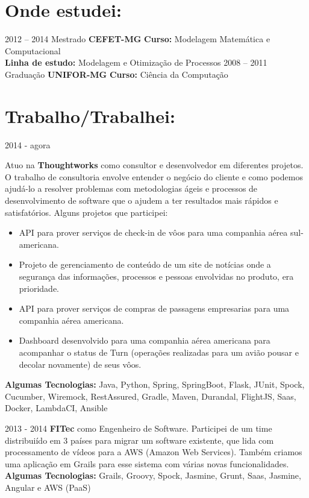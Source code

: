 \documentclass[]{friggeri-cv}
\begin{document}
\section{Onde estudei:}

\begin{entrylist}
  \entry
    {2012 – 2014}
    {Mestrado}
    {\textbf{CEFET-MG}}
    {\textbf{Curso:} Modelagem Matemática e Computacional\\ \textbf{Linha de estudo:} Modelagem e Otimização de Processos}
  \entry
    {2008 – 2011}
    {Graduação}
    {\textbf{UNIFOR-MG}}
    {\textbf{Curso:} Ciência da Computação}  
\end{entrylist}

\section{Trabalho/Trabalhei:}
\begin{entrylist}
  \entry
    {2014 - agora}
    {{\normalfont Atuo na \textbf{Thoughtworks} como consultor e desenvolvedor em diferentes projetos. O trabalho de consultoria envolve entender o negócio do cliente e como podemos ajudá-lo a resolver problemas com metodologias ágeis e processos de desenvolvimento de software que o ajudem a ter resultados mais rápidos e satisfatórios. Alguns projetos que participei:\\
    \begin{itemize}  
\item API para prover serviços de check-in de vôos para uma companhia aérea sul-americana.
\item Projeto de gerenciamento de conteúdo de um site de notícias onde a segurança das informações, processos e pessoas envolvidas no produto, era prioridade.
\item API para prover serviços de compras de passagens empresarias para uma companhia aérea americana.
\item Dashboard desenvolvido para uma companhia aérea americana para acompanhar o status de Turn (operações realizadas para um avião pousar e decolar novamente) de seus vôos.
\end{itemize}
\textbf{Algumas Tecnologias:} Java, Python, Spring, SpringBoot, Flask, JUnit, Spock, Cucumber, Wiremock, RestAssured, Gradle, Maven, Durandal, FlightJS, Saas, Docker, LambdaCI, Ansible
    }}{}{}
  
  \entry
    {2013 - 2014}
    {{\normalfont \textbf{FITec} como Engenheiro de Software.  Participei de um time distribuiído em 3 países para migrar um software existente, que lida com processamento de vídeos para a AWS (Amazon Web Services). Também criamos uma aplicação em Grails para esse sistema com várias novas funcionalidades.
        \\\textbf{Algumas Tecnologias:} Grails, Groovy, Spock, Jasmine, Grunt, Saas, Jasmine, Angular e AWS (PaaS)
    }}{}{}
\end{entrylist}
\end{document}
